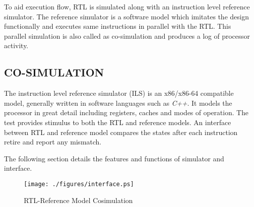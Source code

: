 To aid execution flow, RTL is simulated along with an instruction level reference simulator. The reference simulator is a software model which imitates the design functionally and executes same instructions in parallel with the RTL. This parallel simulation is also called as co-simulation and produces a log of processor activity.


\subsection {CO-SIMULATION}
The instruction level reference simulator (ILS)  is an x86/x86-64 compatible model, generally written in software languages such as {\it C++}. It models the processor in great detail including registers, caches and modes of operation. The test provides stimulus to both the RTL and reference models. An interface between RTL and reference model compares the states after each instruction retire and report any mismatch. 

The following section details the features and functions of simulator and interface. 



\begin{figure}[h]
\centering
\texttt{[image: ./figures/interface.ps]}
\caption{RTL-Reference Model Cosimulation} 
\label{fig:interface.ps}
\end{figure}





